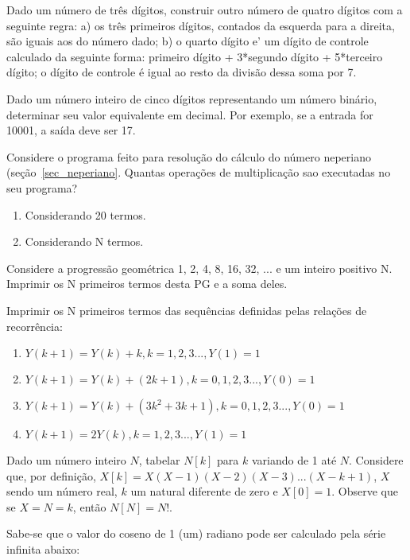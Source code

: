 \item Dado um número de três dígitos, construir outro número de quatro
   dígitos com a seguinte regra: a) os três primeiros  dígitos,
   contados da esquerda para a direita, são iguais aos do número dado;
   b) o quarto dígito e' um dígito de controle calculado da seguinte forma:
   primeiro dígito + 3*segundo dígito + 5*terceiro dígito; o dígito de
   controle é igual ao resto da divisão dessa soma por 7.

\item Dado um  número inteiro  de  cinco dígitos  representando um  número
   binário, determinar seu valor equivalente em decimal. Por exemplo, se a
   entrada for 10001, a saída deve ser 17.

\item Considere o programa feito para resolução do cálculo do número neperiano
      (seção~\ref{sec_neperiano}.
     Quantas operações de multiplicação sao executadas no seu programa?
\begin{enumerate}
\item Considerando 20 termos.
\item Considerando N termos.
\end{enumerate}

\item Considere a progressão geométrica 1, 2, 4, 8, 16, 32, ... e um inteiro 
   positivo N. Imprimir os N primeiros termos desta PG e a soma deles.

\item Imprimir os N primeiros termos das sequências definidas pelas relações
   de recorrência:

\begin{enumerate}
\item $Y(k+1) = Y(k) + k, k = 1,2,3..., Y(1)=1$
\item $Y(k+1) = Y(k) + (2k+1), k = 0,1,2,3..., Y(0)=1$
\item $Y(k+1) = Y(k) + (3k^2 + 3k + 1), k = 0,1,2,3..., Y(0)=1$
\item $Y(k+1) = 2Y(k), k = 1,2,3..., Y(1)=1$
\end{enumerate}

\item Dado um número  inteiro $N$,  tabelar $N[k]$  para $k$  variando de  1 até
     $N$.  Considere  que,  por definição,  $X[k]=X(X-1)(X-2)(X-3)...(X-k+1)$,  
     $X$
     sendo um número  real, $k$ um natural diferente de  zero e $X[0]=1$. 
     Observe que se $X=N=k$, então $N[N]=N!$. 

\item Sabe-se  que o valor do coseno  de 1 (um) radiano  pode ser calculado
    pela série infinita abaixo:


